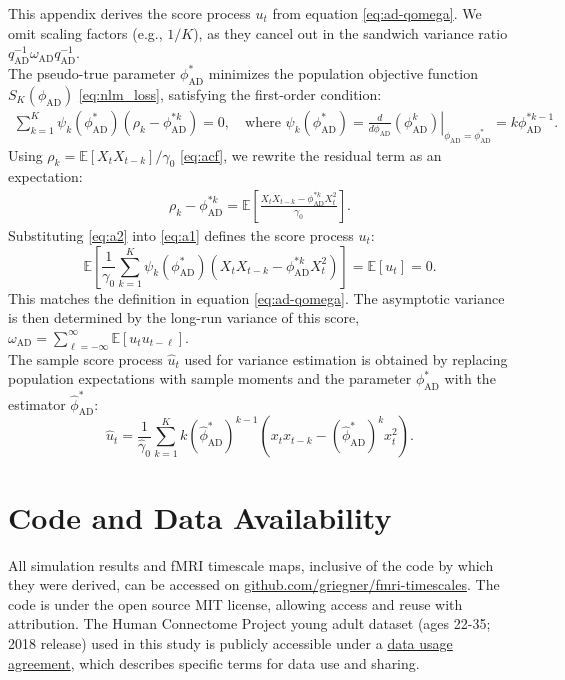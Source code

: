 \documentclass[9pt]{article}
\newcommand{\phiad}{\phi_{\scriptscriptstyle\text{AD}}}
\newcommand{\hatphiad}{\hat{\phi}^*_{\scriptscriptstyle\text{AD}}}
\newcommand{\qad}{q_{\scriptscriptstyle\text{AD}}}
\newcommand{\omegaad}{\omega_{\scriptscriptstyle\text{AD}}}
\begin{document}
This appendix derives the score process $u_t$ from equation \eqref{eq:ad-qomega}. We omit scaling factors (e.g., $1/K$), as they cancel out in the sandwich variance ratio $\qad^{-1} \omegaad \qad^{-1}$.\\

\noindent The pseudo-true parameter $\phiad^*$ minimizes the population objective function $S_K(\phiad)$ \eqref{eq:nlm_loss}, satisfying the first-order condition:
\begin{align}\label{eq:a1}
    \sum_{k=1}^{K} \psi_k(\phiad^*) (\rho_k - \phiad^{*k}) = 0, \quad \text{where } \psi_k(\phiad^*) = \left. \frac{d}{d\phiad}(\phiad^k) \right|_{\phiad=\phiad^*} = k\phi_{\text{AD}}^{*k-1}.
\end{align}
Using $\rho_k = \mathbb{E}[X_t X_{t-k}]/\gamma_0$ \eqref{eq:acf}, we rewrite the residual term as an expectation:
\begin{align}\label{eq:a2}
    \rho_k - \phiad^{*k} = \mathbb{E}\left[ \frac{X_t X_{t-k} - \phiad^{*k} X_t^2}{\gamma_0} \right].
\end{align}
Substituting \eqref{eq:a2} into \eqref{eq:a1} defines the score process $u_t$:
\begin{equation}
    \mathbb{E}\left[ \frac{1}{\gamma_0} \sum_{k=1}^{K} \psi_k(\phiad^*) (X_t X_{t-k} - \phiad^{*k} X_t^2) \right] = \mathbb{E}[u_t] = 0.
\end{equation}
This matches the definition in equation \eqref{eq:ad-qomega}. The asymptotic variance is then determined by the long-run variance of this score, $\omegaad = \sum_{\ell=-\infty}^{\infty} \mathbb{E}[u_t u_{t-\ell}]$.\\

\noindent The sample score process $\hat{u}_t$ used for variance estimation is obtained by replacing population expectations with sample moments and the parameter $\phiad^*$ with the estimator $\hatphiad$:
\begin{equation}
    \hat{u}_t = \frac{1}{\hat{\gamma}_0} \sum_{k=1}^{K} k (\hatphiad)^{k-1} (x_t x_{t-k} - (\hatphiad)^k x_t^2).
\end{equation}

\section*{Code and Data Availability}
All simulation results and fMRI timescale maps, inclusive of the code by which they were derived, can be accessed on \href{https://github.com/griegner/fmri-timescales}{github.com/griegner/fmri-timescales}. The code is under the open source MIT license, allowing access and reuse with attribution. The Human Connectome Project young adult dataset (ages 22-35; 2018 release) used in this study is publicly accessible under a \href{https://www.humanconnectome.org/storage/app/media/data_use_terms/DataUseTerms-HCP-Open-Access-26Apr2013.pdf}{data usage agreement}, which describes specific terms for data use and sharing.
\end{document}
